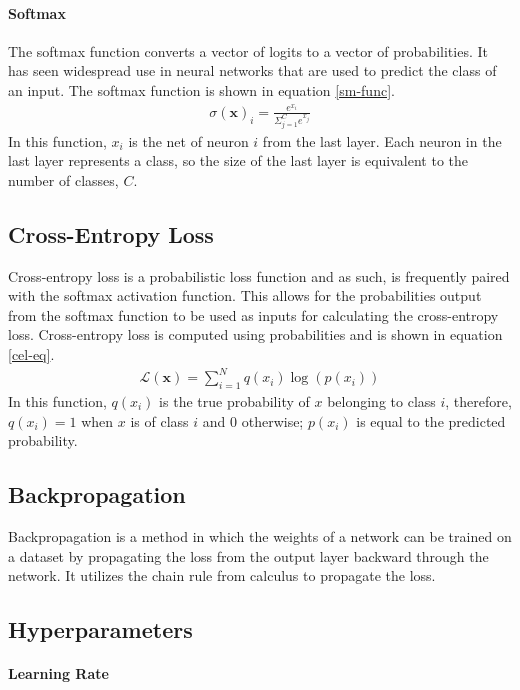 \paragraph{Softmax}
The softmax function converts a vector of logits to a vector of probabilities. It has seen widespread use in neural networks that are used to predict the class of an input. The softmax function is shown in equation \ref{sm-func}.
\begin{align}
\sigma(\mathbf{x})_i = \frac{e^{x_i}}{\Sigma_{j=1}^C e^{x_j}} \label{sm-func}
\end{align}
In this function, $x_i$ is the net of neuron $i$ from the last layer. Each neuron in the last layer represents a class, so the size of the last layer is equivalent to the number of classes, $C$. 


\subsection{Cross-Entropy Loss}
Cross-entropy loss is a probabilistic loss function and as such, is frequently paired with the softmax activation function. This allows for the probabilities output from the softmax function to be used as inputs for calculating the cross-entropy loss. Cross-entropy loss is computed using probabilities and is shown in equation \ref{cel-eq}.
\begin{align}
\mathcal{L}(\mathbf{x}) = \sum_{i=1}^{N} q(x_i)\log(p(x_i))\label{cel-eq}
\end{align}
In this function, $q(x_i)$ is the true probability of $x$ belonging to class $i$, therefore, $q(x_i) = 1$ when $x$ is of class $i$ and $0$ otherwise; $p(x_i)$ is equal to the predicted probability.

\subsection{Backpropagation}\label{backprop}
Backpropagation is a method in which the weights of a network can be trained on a dataset by propagating the loss from the output layer backward through the network. It utilizes the chain rule from calculus to propagate the loss.


\subsection{Hyperparameters}
\paragraph{Learning Rate}
